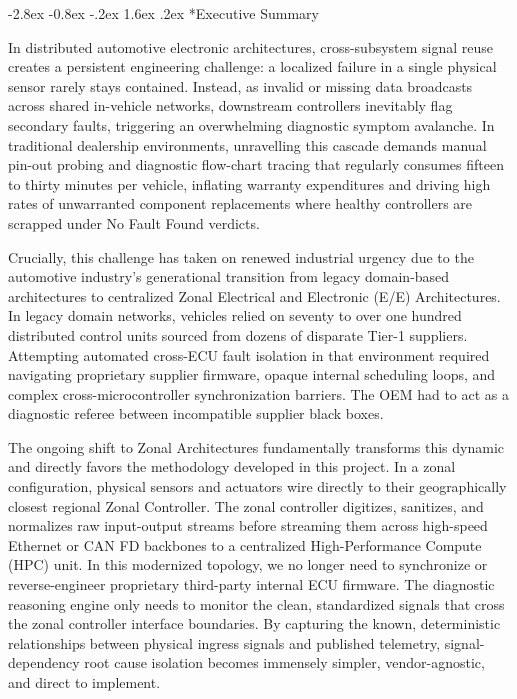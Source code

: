 \documentclass[11pt,a4paper]{article}
\makeatletter
\renewcommand{\section}{\@startsection{section}{1}{\z@}%
  {-2.8ex \@plus -0.8ex \@minus -.2ex}%
  {1.6ex \@plus.2ex}%
  {\normalfont\large\bfseries\color{tatablue}}}
\makeatother
\begin{document}
\newpage
{}
\setcounter{page}{2}

\section*{Executive Summary}

In distributed automotive electronic architectures, cross-subsystem signal reuse creates a persistent engineering challenge: a localized failure in a single physical sensor rarely stays contained. Instead, as invalid or missing data broadcasts across shared in-vehicle networks, downstream controllers inevitably flag secondary faults, triggering an overwhelming diagnostic symptom avalanche. In traditional dealership environments, unravelling this cascade demands manual pin-out probing and diagnostic flow-chart tracing that regularly consumes fifteen to thirty minutes per vehicle, inflating warranty expenditures and driving high rates of unwarranted component replacements where healthy controllers are scrapped under No Fault Found verdicts.

Crucially, this challenge has taken on renewed industrial urgency due to the automotive industry's generational transition from legacy domain-based architectures to centralized Zonal Electrical and Electronic (E/E) Architectures. In legacy domain networks, vehicles relied on seventy to over one hundred distributed control units sourced from dozens of disparate Tier-1 suppliers. Attempting automated cross-ECU fault isolation in that environment required navigating proprietary supplier firmware, opaque internal scheduling loops, and complex cross-microcontroller synchronization barriers. The OEM had to act as a diagnostic referee between incompatible supplier black boxes. 

The ongoing shift to Zonal Architectures fundamentally transforms this dynamic and directly favors the methodology developed in this project. In a zonal configuration, physical sensors and actuators wire directly to their geographically closest regional Zonal Controller. The zonal controller digitizes, sanitizes, and normalizes raw input-output streams before streaming them across high-speed Ethernet or CAN FD backbones to a centralized High-Performance Compute (HPC) unit. In this modernized topology, we no longer need to synchronize or reverse-engineer proprietary third-party internal ECU firmware. The diagnostic reasoning engine only needs to monitor the clean, standardized signals that cross the zonal controller interface boundaries. By capturing the known, deterministic relationships between physical ingress signals and published telemetry, signal-dependency root cause isolation becomes immensely simpler, vendor-agnostic, and direct to implement.
\end{document}
